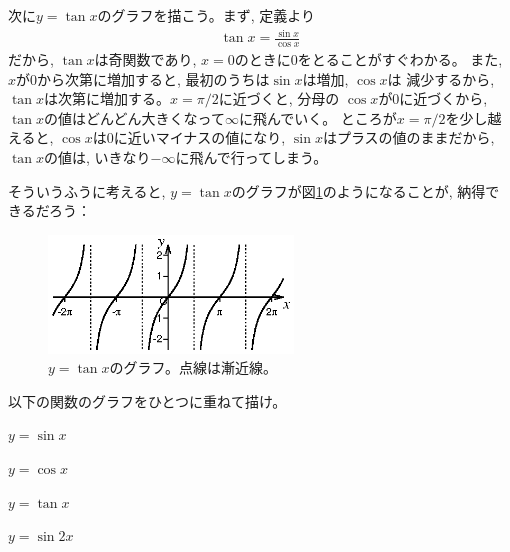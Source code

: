 次に$y=\tan x$のグラフを描こう。まず, 定義より
\begin{eqnarray}
\tan x=\frac{\sin x}{\cos x}
\end{eqnarray}
だから, $\tan x$は奇関数であり, $x=0$のときに0をとることがすぐわかる。
また, $x$が0から次第に増加すると, 最初のうちは$\sin x$は増加, $\cos x$は
減少するから, $\tan x$は次第に増加する。$x=\pi/2$に近づくと, 分母の
$\cos x$が0に近づくから, $\tan x$の値はどんどん大きくなって$\infty$に飛んでいく。
ところが$x=\pi/2$を少し越えると, $\cos x$は0に近いマイナスの値になり, 
$\sin x$はプラスの値のままだから, $\tan x$の値は, いきなり$-\infty$に飛んで行ってしまう。

そういうふうに考えると, $y=\tan x$のグラフが図\ref{fig:tan}のようになることが, 納得できるだろう：
\begin{figure}[h]
    \centering
    \includegraphics[width=6.5cm]{tan.eps}
    \caption{$y=\tan x$のグラフ。点線は漸近線。}\label{fig:tan}
\end{figure}

\begin{q}\label{q:trig_singraph0} 以下の関数のグラフをひとつに重ねて描け。
\begin{edaenumerate}
\item $y=\sin x$
\item $y=\cos x$
\item $y=\tan x$
\item $y=\sin 2x$
\end{edaenumerate}\end{q}

